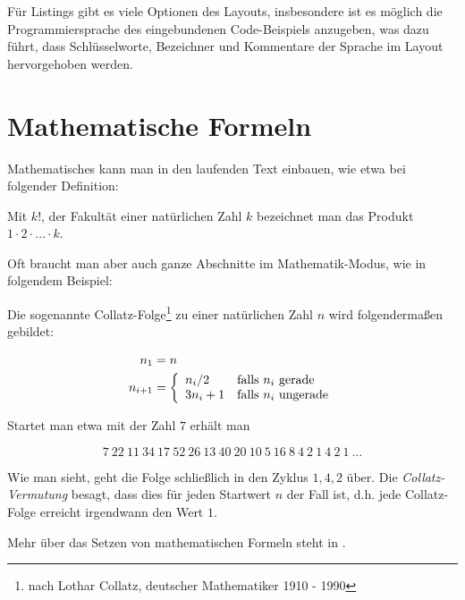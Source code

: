 Für Listings gibt es viele Optionen des Layouts, insbesondere ist es
möglich die Programmiersprache des eingebundenen Code-Beispiels
anzugeben, was dazu führt, dass Schlüsselworte, Bezeichner und Kommentare
der Sprache im Layout hervorgehoben werden.

\section{Mathematische Formeln}

Mathematisches kann man in den laufenden Text einbauen, wie etwa bei
folgender Definition:

Mit $k!$, der Fakultät einer natürlichen Zahl $k$ bezeichnet man das
Produkt $1 \cdot 2 \cdot \dotso \cdot k$.

Oft braucht man aber auch ganze Abschnitte im Mathematik-Modus, wie in
folgendem Beispiel:

		Die sogenannte Collatz-Folge\footnote{ nach Lothar Collatz,
		deutscher Mathematiker 1910 - 1990} zu einer natürlichen Zahl $n$
		wird folgendermaßen gebildet:

	\begin{align}
	  n_1 &= n \nonumber \\
		n_{i+1} &= \left\{ \begin{array}{l l}
	                   n_i/2      & \textrm{falls $n_i$ gerade}\\
										 3 n_i + 1  & \textrm{falls $n_i$ ungerade}
										 \end{array} \right. \nonumber
	\end{align}

	\medskip
										 
	Startet man etwa mit der Zahl $7$ erhält man

	\[7\ 22\ 11\ 34\ 17\ 52\ 26\ 13\ 40\ 20\ 10\ 5\ 16\ 8\ 4\ 2\ 1\ 4\ 2\ 1\ \dots\]

	Wie man sieht, geht die Folge schließlich in den Zyklus $1, 4, 2$
	über.  Die \emph{Collatz-Vermutung} besagt, dass dies für jeden
	Startwert $n$ der Fall ist, d.h.  jede Collatz-Folge erreicht
	irgendwann den Wert $1$.

Mehr über das Setzen von mathematischen Formeln steht in \cite[Kapitel 4]{lkurz15}.



